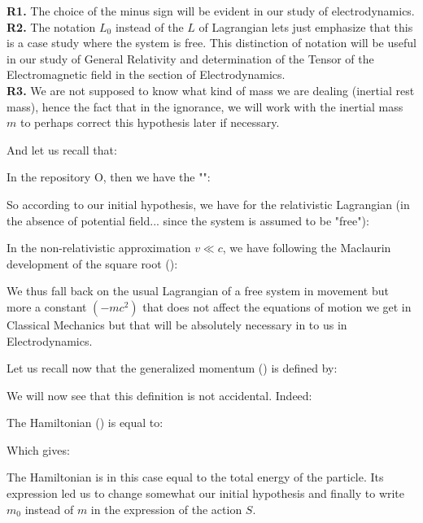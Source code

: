 	\begin{tcolorbox}[title=Remarks,colframe=black,arc=10pt]
	\textbf{R1.} The choice of the minus sign will be evident in our study of electrodynamics.\\
	
	\textbf{R2.} The notation $L_0$ instead of the $L$ of Lagrangian lets just emphasize that this is a case study where the system is free. This distinction of notation will be useful in our study of General Relativity and determination of the Tensor of the Electromagnetic field in the section of Electrodynamics.\\
	
	\textbf{R3.} We are not supposed to know what kind of mass we are dealing (inertial rest mass), hence the fact that in the ignorance, we will work with the inertial mass $m$ to perhaps correct this hypothesis later if necessary.
	\end{tcolorbox}
	And let us recall that:
	
	In the repository O, then we have the "":
	
	So according to our initial hypothesis, we have for the relativistic Lagrangian (in the absence of potential field... since the system is assumed to be "free"):
	
	In the non-relativistic approximation $v\ll c$, we have following the Maclaurin development of the square root ():
	
	We thus fall back on the usual Lagrangian of a free system in movement but more a constant $(-mc^2)$ that does not affect the equations of motion we get in Classical Mechanics but that will be absolutely necessary in to us in Electrodynamics.

	Let us recall now that the generalized momentum () is defined by:
	
	We will now see that this definition is not accidental. Indeed:
	
	The Hamiltonian () is equal to:
	
	Which gives:
	
	The Hamiltonian is in this case equal to the total energy of the particle. Its expression led us to change somewhat our initial hypothesis and finally to write $m_0$ instead of $m$ in the expression of the action $S$.

